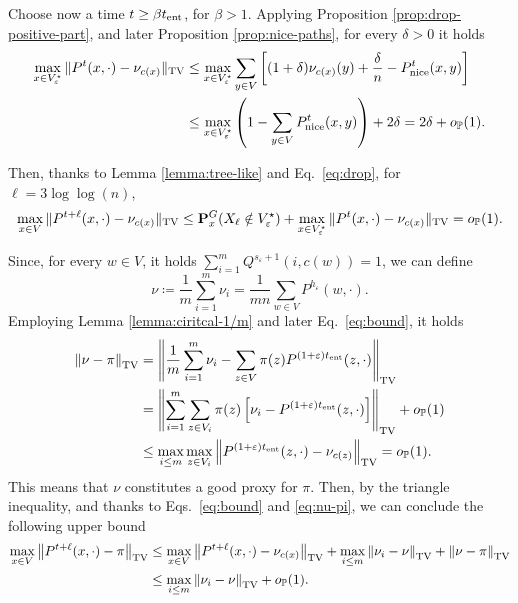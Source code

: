 \documentclass[11pt,oneside]{amsart}
\numberwithin{equation}{section}  %
\theoremstyle{plain}
\newcommand{\eps}{\varepsilon}
\newcommand{\p}{\mathbb{P}}
\newcommand{\op}{o_{\p}}
\newcommand{\tv}[1]{\left\|#1\right\|_{\rm TV}}
\newcommand{\tent}{t_{\textup{ent}}}
\newcommand{\quenchG}{\mathbf{P}^G}
\newcommand{\semi}{{Q}}
\newcommand{\veps}{V^{\star}_\eps}
\newcommand{\h}{{h_\eps}}
\newcommand{\s}{{s_\eps}}
\begin{document}
    Choose now a time $t \ge \beta \tent$, for $\beta>1$. Applying Proposition \ref{prop:drop-positive-part}, and later Proposition \ref{prop:nice-paths}, for every $\delta>0$ it holds
	\begin{equation} 
		\begin{split}\label{eq:drop}
		\max_{x \in \veps}\|P^{t}(x,\cdot)-\nu_{c(x)}\|_{\textup{TV}}&\le
		\max_{x \in \veps}\sum_{y \in V}\left[(1+\delta)\nu_{c(x)}(y)+\frac{\delta}{n}-P_{\rm nice}^t(x,y)\right]\\
		&\le \max_{x\in\veps}\left(1-\sum_{y\in V}P_{\rm nice}^t(x,y)\right)+2\delta=2\delta+\op(1).
		\end{split}
	\end{equation}

	Then, thanks to Lemma \ref{lemma:tree-like} and Eq.~\eqref{eq:drop}, for $\ell=3 \log \log(n)$,
	\begin{equation} \label{eq:bound}
		\max_{x \in V}\|P^{t+\ell}(x,\cdot)-\nu_{c(x)}\|_{\textup{TV}} \le \quenchG_x(X_\ell \notin \veps) + \max_{x \in \veps}\|P^{t}(x,\cdot)-\nu_{c(x)}\|_{\textup{TV}} =\op(1).
	\end{equation}

Since, for every $w \in V$, it holds $\sum_{i =1}^m{\semi^ {\s+1}(i,c(w))}=1$, we can define
	\begin{equation}\label{eq:nu}
		\nu \coloneqq \frac 1{m} \sum_{i =1}^m\nu_i  =  \frac{1}{mn} \sum_{w \in V}P^\h(w,\cdot).
	\end{equation} 
	 Employing Lemma \ref{lemma:ciritcal-1/m} and later Eq.~\eqref{eq:bound}, it holds
		\begin{equation} \label{eq:nu-pi}
			\begin{split}
				\tv { \nu-\pi} 
				& = \tv { \frac1m\sum_{i=1}^m \nu_i-\sum_{z \in V} \pi(z)P^{(1+\eps)\tent}(z,\cdot)} \\
				& = \tv { \sum_{i=1}^m\sum_{z \in V_i} {\pi(z)} \left[\nu_i-P^{(1+\eps)\tent}(z,\cdot)\right]}+\op(1) \\
				& \le \max_{i \le m}\max_{z \in V_i} \tv {P^{(1+\eps)\tent}(z,\cdot)- \nu_{c(z)}}=\op(1).
			\end{split}
		\end{equation}
    This means that $\nu$ constitutes a good proxy for $\pi$. 
    Then, by the triangle inequality, and thanks to Eqs.~\eqref{eq:bound} and \eqref{eq:nu-pi}, we can conclude the following upper bound
\begin{equation}  \label{eq:bound2}
    \begin{split}
	\max_{x \in V}\tv{P^{t+\ell}(x,\cdot)-\pi} 
    &\le  \max_{x \in V}\tv{P^{t+\ell}(x,\cdot)-\nu_{c(x)}}+\max_{i \le m}\tv{\nu_i-\nu}+\tv{\nu-\pi}\\
    & \le \max_{i \le m}\tv{\nu_i-\nu}+\op(1).
    \end{split}
\end{equation}
    
\end{document}
